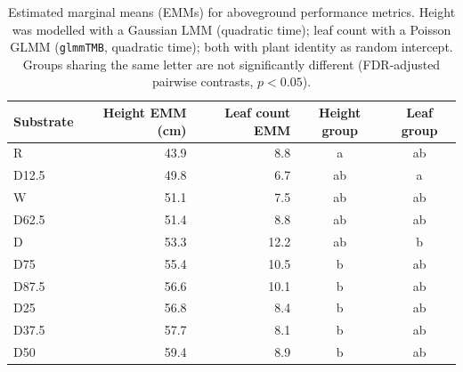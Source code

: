 \begin{table}[htbp]
\centering
\caption{Estimated marginal means (EMMs) for aboveground performance metrics. Height was modelled with a Gaussian LMM (quadratic time); leaf count with a Poisson GLMM (\texttt{glmmTMB}, quadratic time); both with plant identity as random intercept. Groups sharing the same letter are not significantly different (FDR-adjusted pairwise contrasts, $p < 0.05$).}
\label{tab:aboveground_lmm}
\small
\begin{tabular}{l rr cc}
\toprule
Substrate & Height EMM (cm) & Leaf count EMM & Height group & Leaf group \\
\midrule
R        & 43.9 & 8.8 & a & ab \\
D12.5    & 49.8 & 6.7 & ab & a \\
W        & 51.1 & 7.5 & ab & ab \\
D62.5    & 51.4 & 8.8 & ab & ab \\
D        & 53.3 & 12.2 & ab & b \\
D75      & 55.4 & 10.5 & b & ab \\
D87.5    & 56.6 & 10.1 & b & ab \\
D25      & 56.8 & 8.4 & b & ab \\
D37.5    & 57.7 & 8.1 & b & ab \\
D50      & 59.4 & 8.9 & b & ab \\
\bottomrule
\end{tabular}
\end{table}
